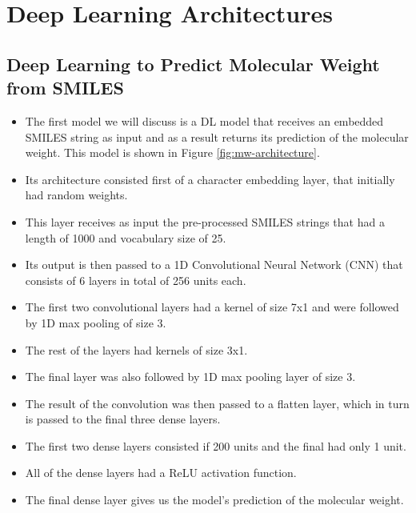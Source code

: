 \section{Deep Learning Architectures \label{archi}}
    \subsection{Deep Learning to Predict Molecular Weight from SMILES}
        \begin{itemize}
            \item The first model we will discuss is a DL model that receives an embedded SMILES string as input and as a result returns its prediction of the molecular weight. This model is shown in Figure \ref{fig:mw-architecture}.
            \item Its architecture consisted first of a character embedding layer, that initially had random weights.
            \item This layer receives as input the pre-processed SMILES strings that had a length of 1000 and vocabulary size of 25.
            \item Its output is then passed to a 1D Convolutional Neural Network (CNN) that consists of 6 layers in total of 256 units each.
            \item The first two convolutional layers had a kernel of size 7x1 and were followed by 1D max pooling of size 3.
            \item The rest of the layers had kernels of size 3x1.
            \item The final layer was also followed by 1D max pooling layer of size 3.
            \item The result of the convolution was then passed to a flatten layer, which in turn is passed to the final three dense layers. 
            \item The first two dense layers consisted if 200 units and the final had only 1 unit. 
            \item All of the dense layers had a ReLU activation function.
            \item The final dense layer gives us the model's prediction of the molecular weight.
        \end{itemize}
